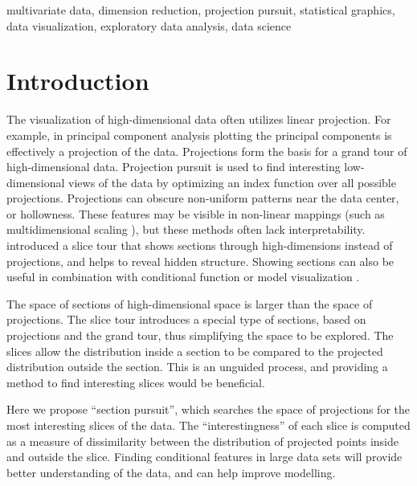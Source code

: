 \documentclass[]{interact}
\theoremstyle{plain}%
\theoremstyle{definition}
\theoremstyle{remark}
\begin{document}
\begin{keywords}
multivariate data, dimension reduction, projection pursuit, statistical
graphics, data visualization, exploratory data analysis, data science
\end{keywords}

\hypersetup{linkcolor=black}
  \tableofcontents

\newpage

\hypertarget{introduction}{%
\section{Introduction}\label{introduction}}

The visualization of high-dimensional data often utilizes linear
projection. For example, in principal component analysis plotting the
principal components is effectively a projection of the data.
Projections form the basis for a grand tour \citep{As85} of
high-dimensional data. Projection pursuit \citep[\citet{FT74}]{kr69} is
used to find interesting low-dimensional views of the data by optimizing
an index function over all possible projections. Projections can obscure
non-uniform patterns near the data center, or hollowness. These features
may be visible in non-linear mappings (such as multidimensional scaling
\citep{mds}), but these methods often lack interpretability.
\citet{laa2019slice} introduced a slice tour that shows sections through
high-dimensions instead of projections, and helps to reveal hidden
structure. Showing sections can also be useful in combination with
conditional function or model visualization
\citep[\citet{sliceplorer}]{JSSv081i05}.

The space of sections of high-dimensional space is larger than the space
of projections. The slice tour \citep{laa2019slice} introduces a special
type of sections, based on projections and the grand tour, thus
simplifying the space to be explored. The slices allow the distribution
inside a section to be compared to the projected distribution outside
the section. This is an unguided process, and providing a method to find
interesting slices would be beneficial.

Here we propose ``section pursuit'', which searches the space of
projections for the most interesting slices of the data. The
``interestingness'' of each slice is computed as a measure of
dissimilarity between the distribution of projected points inside and
outside the slice. Finding conditional features in large data sets will
provide better understanding of the data, and can help improve
modelling.
\end{document}
